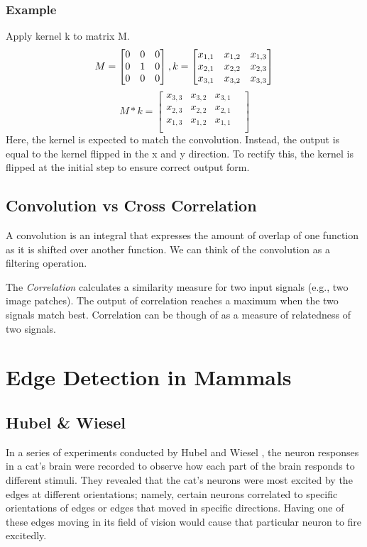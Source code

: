\documentclass{article}
\begin{document}
\subsubsection{Example}
Apply kernel k to matrix M.
$$ M = \begin{bmatrix}
0 & 0 & 0\\
0 & 1 & 0\\
0 & 0 & 0
\end{bmatrix}, \\
k = \begin{bmatrix}
x_{1,1} & x_{1,2} & x_{1,3} \\
x_{2,1} & x_{2,2} & x_{2,3}\\
x_{3,1} & x_{3,2} & x_{3,3}\\
\end{bmatrix}$$
$$ M * k = \begin{bmatrix}
x_{3,3} & x_{3,2} & x_{3,1} &\\
x_{2,3} & x_{2,2} & x_{2,1} &\\
x_{1,3} & x_{1,2} & x_{1,1} &\\
\end{bmatrix}$$
Here, the kernel is expected to match the convolution. Instead, the output is equal to the kernel flipped in the x and y direction. To rectify this, the kernel is flipped at the initial step to ensure correct output form.
\subsection{Convolution vs Cross Correlation}
A convolution is an integral that expresses the amount of overlap of one function as it is shifted over another function. We can think of the convolution as a filtering operation. \newline

The \textit{Correlation} calculates a similarity measure for two input signals (e.g., two image patches). The output of correlation reaches a maximum when the two signals match best. Correlation can be though of as a measure of relatedness of two signals.

\section{Edge Detection in Mammals}

\subsection{Hubel \& Wiesel}
In a series of experiments conducted by Hubel and Wiesel \cite{hubel1960receptive}, the neuron responses in a cat's brain were recorded to observe how each part of the brain responds to different stimuli. They revealed that the cat’s neurons were most excited by the edges at different orientations; namely, certain neurons correlated to specific orientations of edges or edges that moved in specific directions. Having one of these edges moving in its field of vision would cause that particular neuron to fire excitedly.
\end{document}
